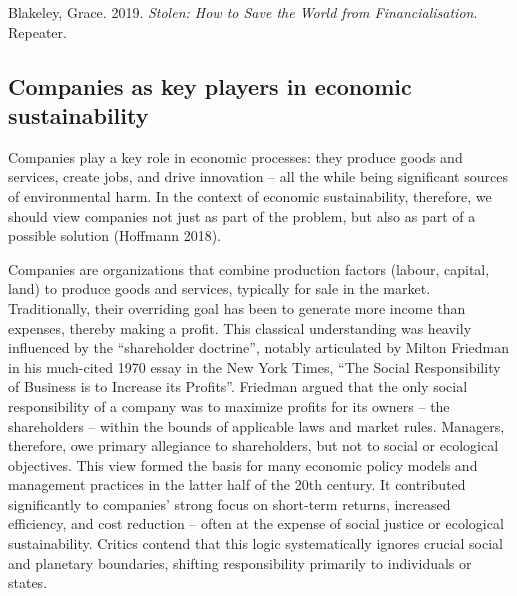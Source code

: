 \documentclass[
  a4paper,
  openany]{book}
\begin{document}
\begin{tcolorbox}[enhanced jigsaw, left=2mm, arc=.35mm, titlerule=0mm, opacityback=0, leftrule=.75mm, title={Further reading}, breakable, bottomtitle=1mm, rightrule=.15mm, coltitle=black, toptitle=1mm, bottomrule=.15mm, colback=white, opacitybacktitle=0.6, colbacktitle=quarto-callout-note-color!10!white, toprule=.15mm, colframe=quarto-callout-note-color-frame]

Blakeley, Grace. 2019. \emph{Stolen: How to Save the World from
Financialisation}. Repeater.

\end{tcolorbox}

\subsection{Companies as key players in economic
sustainability}\label{companies-as-key-players-in-economic-sustainability}

Companies play a key role in economic processes: they produce goods and
services, create jobs, and drive innovation -- all the while being
significant sources of environmental harm. In the context of economic
sustainability, therefore, we should view companies not just as part of
the problem, but also as part of a possible solution (Hoffmann 2018).

Companies are organizations that combine production factors (labour,
capital, land) to produce goods and services, typically for sale in the
market. Traditionally, their overriding goal has been to generate more
income than expenses, thereby making a profit. This classical
understanding was heavily influenced by the ``shareholder doctrine'',
notably articulated by Milton Friedman in his much-cited 1970 essay in
the New York Times, ``The Social Responsibility of Business is to
Increase its Profits''. Friedman argued that the only social
responsibility of a company was to maximize profits for its owners --
the shareholders -- within the bounds of applicable laws and market
rules. Managers, therefore, owe primary allegiance to shareholders, but
not to social or ecological objectives. This view formed the basis for
many economic policy models and management practices in the latter half
of the 20th century. It contributed significantly to companies' strong
focus on short-term returns, increased efficiency, and cost reduction --
often at the expense of social justice or ecological sustainability.
Critics contend that this logic systematically ignores crucial social
and planetary boundaries, shifting responsibility primarily to
individuals or states.
\end{document}
